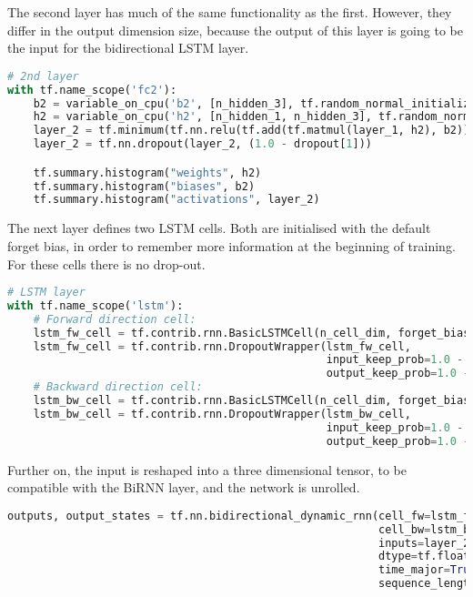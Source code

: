 The second layer has much of the same functionality as the first. However, they differ in the output dimension size, because the output of this layer is going to be the input for the bidirectional LSTM layer.
\begin{lstlisting}[language=Python, flexiblecolumns=true, caption=Second fully connected layer.]
# 2nd layer
with tf.name_scope('fc2'):
    b2 = variable_on_cpu('b2', [n_hidden_3], tf.random_normal_initializer(stddev=b2_stddev))
    h2 = variable_on_cpu('h2', [n_hidden_1, n_hidden_3], tf.random_normal_initializer(stddev=h2_stddev))
    layer_2 = tf.minimum(tf.nn.relu(tf.add(tf.matmul(layer_1, h2), b2)), relu_clip)
    layer_2 = tf.nn.dropout(layer_2, (1.0 - dropout[1]))

    tf.summary.histogram("weights", h2)
    tf.summary.histogram("biases", b2)
    tf.summary.histogram("activations", layer_2)
\end{lstlisting}
The next layer defines two LSTM cells. Both are initialised with the default forget bias, in order to remember more information at the beginning of training. For these cells there is no drop-out.
\begin{lstlisting}[language=Python, flexiblecolumns=true, caption=BiRNN Layer.]
# LSTM layer
with tf.name_scope('lstm'):
    # Forward direction cell:
    lstm_fw_cell = tf.contrib.rnn.BasicLSTMCell(n_cell_dim, forget_bias=1.0, state_is_tuple=True)
    lstm_fw_cell = tf.contrib.rnn.DropoutWrapper(lstm_fw_cell,
                                                 input_keep_prob=1.0 - dropout[3],
                                                 output_keep_prob=1.0 - dropout[3])
    # Backward direction cell:
    lstm_bw_cell = tf.contrib.rnn.BasicLSTMCell(n_cell_dim, forget_bias=1.0, state_is_tuple=True)
    lstm_bw_cell = tf.contrib.rnn.DropoutWrapper(lstm_bw_cell,
                                                 input_keep_prob=1.0 - dropout[4],
                                                 output_keep_prob=1.0 - dropout[4])                                       \end{lstlisting}
Further on, the input is reshaped into a three dimensional tensor, to be compatible with the BiRNN layer, and the network is unrolled. 
\begin{lstlisting}[language=Python, flexiblecolumns=true, caption=BiRNN Layer.]
outputs, output_states = tf.nn.bidirectional_dynamic_rnn(cell_fw=lstm_fw_cell,
                                                         cell_bw=lstm_bw_cell,
                                                         inputs=layer_2,
                                                         dtype=tf.float32,
                                                         time_major=True,
                                                         sequence_length=seq_length\end{lstlisting}
